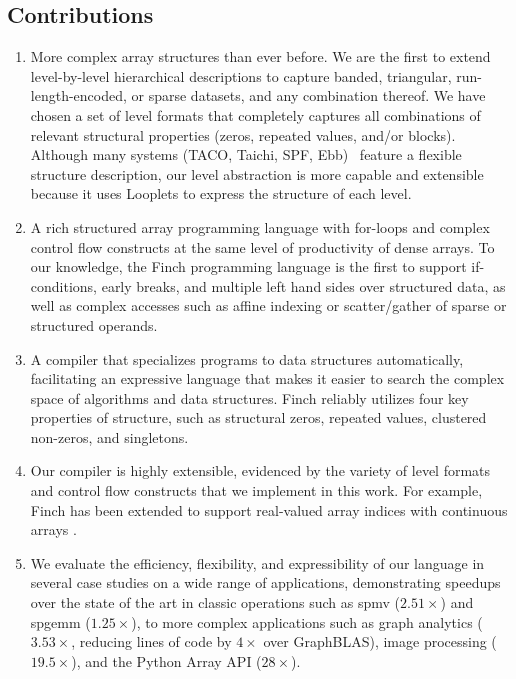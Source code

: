 \subsection{Contributions}


\begin{enumerate}
\item More complex array structures than ever before. We are the first to extend level-by-level hierarchical descriptions to capture banded, triangular, run-length-encoded, or sparse datasets, and any combination thereof.
%
We have chosen a set of level formats that completely captures all combinations of relevant structural properties (zeros, repeated values, and/or blocks).
%
Although many systems (TACO, Taichi, SPF, Ebb)~\cite{chou2018format,  hu_taichi_2019, strout2018sparse, bernstein2016ebb} feature a flexible structure description, our level abstraction is more capable and extensible because it uses Looplets \cite{ahrens_looplets_2023} to express the structure of each level. 
%
\item A rich structured array programming language with for-loops and complex control flow constructs at the same level of productivity of dense arrays. 
%
To our knowledge, the Finch programming language is the first to support if-conditions, early breaks, and multiple left hand sides over structured data, as well as complex accesses such as affine indexing or scatter/gather of sparse or structured operands.
%
\item A compiler that specializes programs to data structures automatically, facilitating an expressive language that makes it easier to search the complex space of algorithms and data structures. Finch reliably utilizes four key properties of structure, such as structural zeros, repeated values, clustered non-zeros, and singletons.
%
\item Our compiler is highly extensible, evidenced by the variety of level formats and control flow constructs that we implement in this work.
%
For example, Finch has been extended to support real-valued array indices with continuous arrays \cite{won2024continuous}.
%
\item We evaluate the efficiency, flexibility, and expressibility of our language in several case studies on a wide range of applications, demonstrating speedups over the state of the art in classic operations such as spmv ($2.51\times$) and spgemm ($1.25\times$), to more complex applications such as graph analytics ($3.53\times$, reducing lines of code by $4\times$ over GraphBLAS), image processing ($19.5\times$), and the Python Array API ($28\times$).

\end{enumerate}
